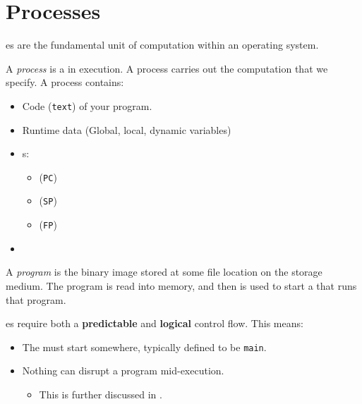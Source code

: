 \section{Processes}\label{sec:Processes}
es are the fundamental unit of computation within an operating system.
\begin{definition}[Process]\label{def:Process}
  A \emph{process} is a  in execution.
  A process carries out the computation that we specify.
  A process contains:
  \begin{itemize}[noitemsep]
  \item Code (\texttt{text}) of your program.
  \item Runtime data (Global, local, dynamic variables)
  \item {}s:
    \begin{itemize}[noitemsep]
    \item {} (\texttt{PC})
    \item {} (\texttt{SP})
    \item {} (\texttt{FP})
    \end{itemize}
  \item {}
  \end{itemize}
\end{definition}

\begin{definition}[Program]\label{def:Program}
  A \emph{program} is the binary image stored at some file location on the storage medium.
  The program is read into memory, and then is used to start a  that runs that program.
\end{definition}

es require both a \textbf{predictable} and \textbf{logical} control flow.
This means:
\begin{itemize}[noitemsep]
\item The  must start somewhere, typically defined to be \texttt{main}.
\item Nothing can disrupt a program mid-execution.
  \begin{itemize}[noitemsep]
  \item This is further discussed in .
  \end{itemize}
\end{itemize}


